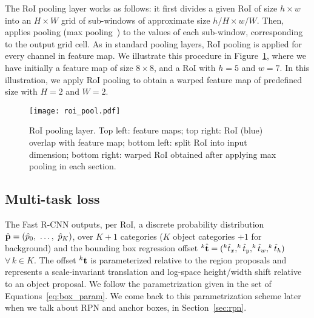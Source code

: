 The RoI pooling layer works as follows:
it first divides a given RoI of size $h\times w$ into an $H\times W$ grid of sub-windows of approximate size $h/H \times w/W$.
Then, applies pooling (\eg max pooling~\cite{goodfellow2016}) to the values of each sub-window, corresponding to the output grid cell.
As in standard pooling layers, RoI pooling is applied for every channel in feature map.
We illustrate this procedure in Figure~\ref{fig:roi_pool}, where we have initially a feature map of size $8\times8$, and a RoI with $h=5$ and $w=7$.
In this illustration, we apply RoI pooling to obtain a warped feature map of predefined size with $H=2$ and $W=2$.
%
\begin{figure}[th!]
	\centering
	\texttt{[image: roi\_pool.pdf]}
	\caption[RoI pooling layer]{RoI pooling layer.
	Top left: feature maps;
	top right: RoI (blue) overlap with feature map;
	bottom left: split RoI into input dimension;
	bottom right: warped RoI obtained after applying max pooling in each section.
	}
	\label{fig:roi_pool}
\end{figure}

\subsection{Multi-task loss}\label{sec:fast_r-cnn_loss}
%
The Fast R-CNN outputs, per RoI, a discrete probability distribution $\hat {\mathbf{p}} = (\hat p_0,~\dots,~\hat p_K)$, over $K+1$ categories ($K$ object categories $+ 1$ for background) and the bounding box regression offset $^{k}\hat{\mathbf{t}} = (^{k}\hat t_{x}, ^{k}\hat t_{y}, ^{k}\hat t_{w}, ^{k}\hat t_{h})$ $\forall\,k \in K$.
The offset $^{k}\mathbf{t}$ is parameterized relative to the region proposals and represents a scale-invariant  translation and log-space height/width shift relative to an object proposal.
We follow the parametrization given in the set of Equations~\eqref{eq:box_param}.
We come back to this parametrization scheme later when we talk about RPN and anchor boxes, in Section~\ref{sec:rpn}.

